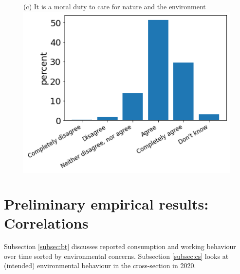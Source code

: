 \documentclass[12pt]{article}
\begin{document}
\begin{figure}[h!!]
\begin{minipage}[h!!]{0.32\textwidth}
	\end{minipage}
	\begin{minipage}[h!!]{0.32\textwidth}  
		\centering\footnotesize{(c) It is a moral duty to care for nature and the environment}
		\includegraphics[width=1\textwidth]{../codding_data/results/liss/qk20a183title0.png}
	\end{minipage}	
\end{figure}

\clearpage
\newpage


\section{Preliminary empirical results: Correlations}
Subsection \ref{subsec:bt} discusses reported consumption and working behaviour over time sorted by environmental concerns. Subsection \ref{subsec:cs} looks  at (intended) environmental behaviour in the cross-section in 2020.
\end{document}
